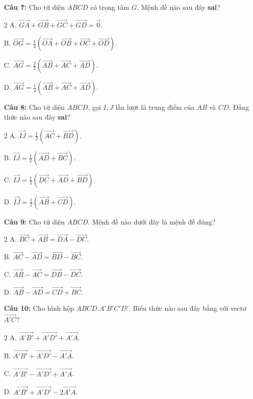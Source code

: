 \documentclass[12pt]{article}
\begin{document}
	\vspace{0.2cm}
	\noindent\textbf{Câu 7:} Cho tứ diện $ABCD$ có trọng tâm $G$. Mệnh đề nào sau đây \textbf{sai}?
	\begin{multicols}{2}
		A. $\overrightarrow{GA} + \overrightarrow{GB} + \overrightarrow{GC} + \overrightarrow{GD} = \vec{0}$. \par
		B. $\overrightarrow{OG} = \frac{1}{4}(\overrightarrow{OA} + \overrightarrow{OB} + \overrightarrow{OC} + \overrightarrow{OD})$. \par
		C. $\overrightarrow{AG} = \frac{2}{3}(\overrightarrow{AB} + \overrightarrow{AC} + \overrightarrow{AD})$. \par
		D. $\overrightarrow{AG} = \frac{1}{4}(\overrightarrow{AB} + \overrightarrow{AC} + \overrightarrow{AD})$.
	\end{multicols}
	
	\vspace{0.2cm}
	\noindent\textbf{Câu 8:} Cho tứ diện $ABCD$, gọi $I, J$ lần lượt là trung điểm của $AB$ và $CD$. Đẳng thức nào sau đây \textbf{sai}?
	\begin{multicols}{2}
		A. $\overrightarrow{IJ} = \frac{1}{2}(\overrightarrow{AC} + \overrightarrow{BD})$. \par
		B. $\overrightarrow{IJ} = \frac{1}{2}(\overrightarrow{AD} + \overrightarrow{BC})$. \par
		C. $\overrightarrow{IJ} = \frac{1}{2}(\overrightarrow{DC} + \overrightarrow{AD} + \overrightarrow{BD})$. \par
		D. $\overrightarrow{IJ} = \frac{1}{2}(\overrightarrow{AB} + \overrightarrow{CD})$.
	\end{multicols}
	
	\vspace{0.2cm}
	\noindent\textbf{Câu 9:} Cho tứ diện $ABCD$. Mệnh đề nào dưới đây là mệnh đề đúng?
	\begin{multicols}{2}
		A. $\overrightarrow{BC} + \overrightarrow{AB} = \overrightarrow{DA} - \overrightarrow{DC}$. \par
		B. $\overrightarrow{AC} - \overrightarrow{AD} = \overrightarrow{BD} - \overrightarrow{BC}$. \par
		C. $\overrightarrow{AB} - \overrightarrow{AC} = \overrightarrow{DB} - \overrightarrow{DC}$. \par
		D. $\overrightarrow{AB} - \overrightarrow{AD} = \overrightarrow{CD} + \overrightarrow{BC}$.
	\end{multicols}
	
	\vspace{0.2cm}
	\noindent\textbf{Câu 10:} Cho hình hộp $ABCD.A'B'C'D'$. Biểu thức nào sau đây bằng với vectơ $\overrightarrow{A'C}$?
	\begin{multicols}{2}
		A. $\overrightarrow{A'B'} + \overrightarrow{A'D'} + \overrightarrow{A'A}$. \par
		B. $\overrightarrow{A'B'} + \overrightarrow{A'D'} - \overrightarrow{A'A}$. \par
		C. $\overrightarrow{A'B'} - \overrightarrow{A'D'} + \overrightarrow{A'A}$. \par
		D. $\overrightarrow{A'B'} + \overrightarrow{A'D'} - 2\overrightarrow{A'A}$.
	\end{multicols}
	
\end{document}
